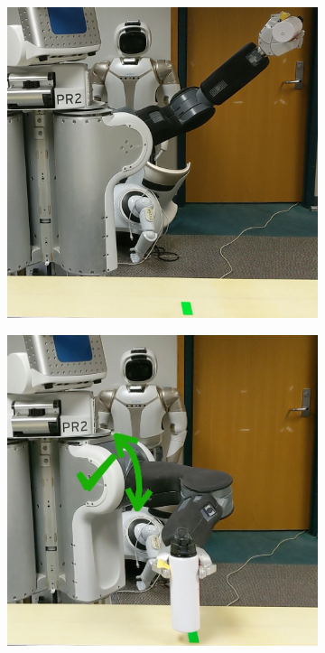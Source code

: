 \begin{figure}[t]
  \centering
  \begin{subfigure}{0.3\linewidth}
    \includegraphics[width=\linewidth]{figures/cmax/pr2_place_initial.png}
  \end{subfigure}
  \begin{subfigure}{0.3\linewidth}
    \includegraphics[width=\linewidth]{figures/cmax/pr2_place_working_final_annotated_thicker.jpg}

\end{subfigure}
\end{figure}
